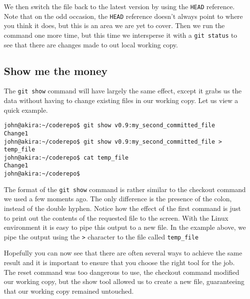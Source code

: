 We then switch the file back to the latest version by using the \texttt{HEAD} reference.  Note that on the odd occasion, the \texttt{HEAD} reference doesn't always point to where you think it does, but this is an area we are yet to cover.  Then we run the command one more time, but this time we intersperse it with a \texttt{git status} to see that there are changes made to out local working copy.

\subsection{Show me the money}
The \texttt{git show} command will have largely the same effect, except it grabs us the data without having to change existing files in our working copy.  Let us view a quick example.

\begin{Verbatim}[frame=leftline,framerule=1mm,fontsize=\relsize{-3}] 
john@akira:~/coderepo$ git show v0.9:my_second_committed_file
Change1
john@akira:~/coderepo$ git show v0.9:my_second_committed_file > temp_file
john@akira:~/coderepo$ cat temp_file 
Change1
john@akira:~/coderepo$ 
\end{Verbatim}

The format of the \texttt{git show} command is rather similar to the checkout command we used a few moments ago.  The only difference is the presence of the colon, instead of the double hyphen.  Notice how the effect of the first command is just to print out the contents of the requested file to the screen.  With the Linux environment it is easy to pipe this output to a new file.  In the example above, we pipe the output using the \texttt{>} character to the file called \texttt{temp\_file}

Hopefully you can now see that there are often several ways to achieve the same result and it is important to ensure that you choose the right tool for the job.  The reset command was too dangerous to use, the checkout command modified our working copy, but the show tool allowed us to create a new file, guaranteeing that our working copy remained untouched.


